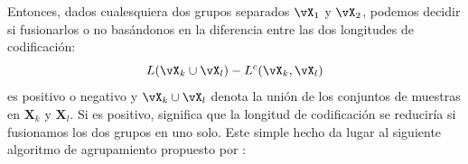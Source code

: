 \documentclass[../../book-main.tex]{subfiles}
\begin{document}
Entonces, dados cualesquiera dos grupos separados $\vX_1$ y $\vX_2$, podemos
decidir si fusionarlos o no basándonos en la diferencia entre
las dos longitudes de codificación:
\begin{equation}
    L(\vX_k \cup \vX_l) - L^c(\vX_k, \vX_l)
\end{equation}
es positivo o negativo y $\vX_k \cup \vX_l$ denota la unión de los
conjuntos de muestras en $\bm X_k$ y $\bm X_l$. Si es positivo,
significa que la longitud de codificación se reduciría si fusionamos los dos
grupos en uno solo. Este simple hecho da lugar al siguiente algoritmo de agrupamiento
propuesto por \cite{ma2007segmentation}:
\begin{algorithm}[!htbp]
    \caption{Descenso más pronunciado por pares de la longitud de 
    codificación}\label{alg:steepest_descent_coding_length}
    \begin{algorithmic}[1]

        \Statex{}
        \Statex{}
        \State{\Return{\(\cC\)}}
        \Else
        \Statex{}
        \EndIf
        \EndWhile
        \State{\Return{\(\cC\)}}
        \EndProcedure
    \end{algorithmic}
\end{algorithm}
\end{document}
